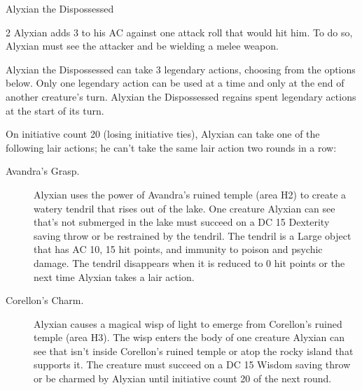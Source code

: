 \documentclass[10pt,a4paper,twoside,bg=print,twocolumn,openany,nodeprecatedcode]{dndbook}
\begin{document}
\begin{DndMonster}[float*=b,width=\textwidth + 8pt]{Alyxian the Dispossessed}
\begin{multicols}{2}
Alyxian adds 3 to his AC against one attack roll that would hit him. To do so, Alyxian must see the attacker and be wielding a melee weapon.

Alyxian the Dispossessed can take 3 legendary actions, choosing from the options below. Only one legendary action can be used at a time and only at the end of another creature's turn. Alyxian the Dispossessed regains spent legendary actions at the start of its turn.

\begin{DndMonsterLegendaryActions}
\end{DndMonsterLegendaryActions}
On initiative count 20 (losing initiative ties), Alyxian can take one of the following lair actions; he can't take the same lair action two rounds in a row:


\begin{description}
\item[Avandra's Grasp.]
Alyxian uses the power of Avandra's ruined temple (area H2) to create a watery tendril that rises out of the lake. One creature Alyxian can see that's not submerged in the lake must succeed on a DC 15 Dexterity saving throw or be restrained by the tendril. The tendril is a Large object that has AC 10, 15 hit points, and immunity to poison and psychic damage. The tendril disappears when it is reduced to 0 hit points or the next time Alyxian takes a lair action.

\item[Corellon's Charm.]
Alyxian causes a magical wisp of light to emerge from Corellon's ruined temple (area H3). The wisp enters the body of one creature Alyxian can see that isn't inside Corellon's ruined temple or atop the rocky island that supports it. The creature must succeed on a DC 15 Wisdom saving throw or be charmed by Alyxian until initiative count 20 of the next round.


\end{description}
\end{multicols}
\end{DndMonster}
\end{document}
